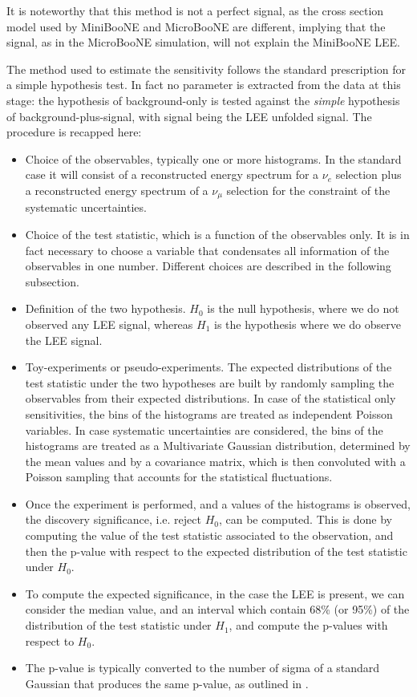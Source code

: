 \documentclass[a4paper]{article}
\newcommand{\nue}{$\nu_e$ }
\newcommand{\numu}{$\nu_{\mu}$ }
\begin{document}
It is noteworthy that this method is not a perfect signal, as the cross section model used by MiniBooNE and MicroBooNE are different, implying that the signal, as in the MicroBooNE simulation, will not explain the MiniBooNE LEE.

The method used to estimate the sensitivity follows the standard prescription for a simple hypothesis test.
In fact no parameter is extracted from the data at this stage: the hypothesis of background-only is tested against the \textit{simple} hypothesis of background-plus-signal, with signal being the LEE unfolded signal.
The procedure is recapped here:
\begin{itemize}
    \item Choice of the observables, typically one or more histograms. In the standard case it will consist of a reconstructed energy spectrum for a \nue selection plus a reconstructed energy spectrum of a \numu selection for the constraint of the systematic uncertainties.
    \item Choice of the test statistic, which is a function of the observables only. It is in fact necessary to choose a variable that condensates all information of the observables in one number. Different choices are described in the following subsection.
    \item Definition of the two hypothesis. $H_0$ is the null hypothesis, where we do not observed any LEE signal, whereas $H_1$ is the hypothesis where we do observe the LEE signal.
    \item Toy-experiments or pseudo-experiments. The expected distributions of the test statistic under the two hypotheses are built by randomly sampling the observables from their expected distributions. In case of the statistical only sensitivities, the bins of the histograms are treated as independent Poisson variables. In case systematic uncertainties are considered, the bins of the histograms are treated as a Multivariate Gaussian distribution, determined by the mean values and by a covariance matrix, which is then convoluted with a Poisson sampling that accounts for the statistical fluctuations.
    \item Once the experiment is performed, and a values of the histograms is observed, the discovery significance, i.e. reject $H_0$, can be computed. This is done by computing the value of the test statistic associated to the observation, and then the p-value with respect to the expected distribution of the test statistic under $H_0$.
    \item To compute the expected significance, in the case the LEE is present, we can consider the median value, and an interval which contain 68\% (or 95\%) of the distribution of the test statistic under $H_1$, and compute the p-values with respect to $H_0$.
    \item The p-value is typically converted to the number of sigma of a standard Gaussian that produces the same p-value, as outlined in \cite{bib:cowan}.
\end{itemize}
\end{document}
